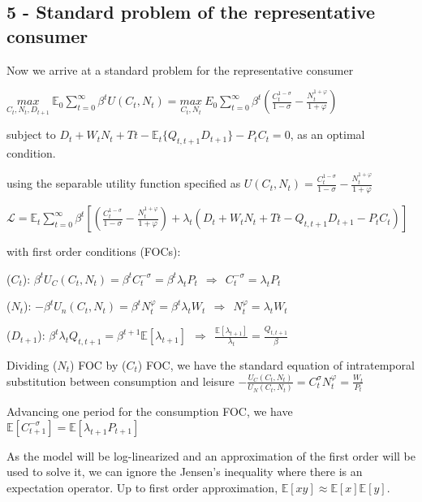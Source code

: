 \documentclass[
]{article}
\begin{document}
\hypertarget{standard-problem-of-the-representative-consumer}{%
\subsection{5 - Standard problem of the representative
consumer}\label{standard-problem-of-the-representative-consumer}}

Now we arrive at a standard problem for the representative consumer

\(\displaystyle \underset{C_t,N_t,D_{t+1}} {max} \ \mathbb{E}_0 \sum_{t=0}^\infty \beta^t U(C_t,N_t) = \displaystyle \underset{C_t,N_t} {max} \ E_0 \sum_{t=0}^\infty \beta^t \left( \frac{C_t^{1-\sigma}}{1-\sigma}-\frac{N_t^{1+\varphi}}{1+\varphi} \right)\)

subject to
\(\displaystyle D_t + W_tN_t + Tt - \mathbb{E}_t\{ Q_{t,t+1}D_{t+1}\} - P_t C_t = 0\),
as an optimal condition.

using the separable utility function specified as
\(\displaystyle U(C_t,N_t)=\frac{C_t^{1-\sigma}}{1-\sigma}-\frac{N_t^{1+\varphi}}{1+\varphi}\)

\(\mathcal{L} = \displaystyle \mathbb{E}_t \sum_{t=0}^\infty \beta^t \left[ \left( \frac{C_t^{1-\sigma}}{1-\sigma}-\frac{N_t^{1+\varphi}}{1+\varphi} \right) + \lambda_t \left( D_t + W_tN_t + Tt - Q_{t,t+1}D_{t+1} - P_t C_t \right) \right]\)

with first order conditions (FOCs):

(\(C_t\)):
\(\displaystyle \beta^t U_C(C_t,N_t)= \beta^tC_t^{-\sigma} = \beta^t \lambda_t P_t \ \ \Rightarrow \ \ C_t^{-\sigma} = \lambda_t P_t\)

(\(N_t\)):
\(\displaystyle -\beta^t U_n(C_t,N_t)=\beta^tN_t^{\varphi} = \beta^t \lambda_t W_t \ \ \Rightarrow \ \ N_t^{\varphi} = \lambda_t W_t\)

(\(D_{t+1}\)):
\(\displaystyle \beta^t \lambda_t Q_{t,t+1} = \beta^{t+1} \mathbb {E}[\lambda_{t+1}] \ \ \Rightarrow \ \ \frac{\mathbb{E}[\lambda_{t+1}]}{\lambda_t} = \frac{Q_{t,t+1}}{\beta}\)

Dividing (\(N_t\)) FOC by (\(C_t\)) FOC, we have the standard equation
of intratemporal substitution between consumption and leisure
\(\displaystyle -\frac{U_C(C_t,N_t)}{U_N(C_t,N_t)} =C_t^{\sigma}N_t^{\varphi} = \frac{W_t}{P_t}\)

Advancing one period for the consumption FOC, we have
\(\mathbb{E} [C_{t+1}^{-\sigma}] = \mathbb{E}[\lambda_{t+1}P_{t+1}]\)

As the model will be log-linearized and an approximation of the first
order will be used to solve it, we can ignore the Jensen's inequality
where there is an expectation operator. Up to first order approximation,
\(\mathbb{E}[xy] \approx \mathbb{E}[x] \mathbb{E}[y]\).
\end{document}
